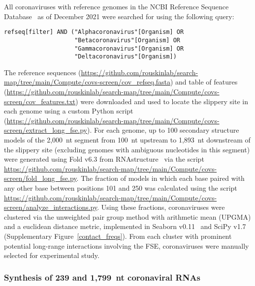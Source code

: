 \documentclass[main.tex]{subfiles}
\begin{document}
All coronaviruses with reference genomes in the NCBI Reference Sequence Database~\cite{OLeary2016} as of December 2021 were searched for using the following query:
\begin{verbatim}
refseq[filter] AND ("Alphacoronavirus"[Organism] OR
                    "Betacoronavirus"[Organism] OR
                    "Gammacoronavirus"[Organism] OR
                    "Deltacoronavirus"[Organism])
\end{verbatim}
The reference sequences (\url{https://github.com/rouskinlab/search-map/tree/main/Compute/covs-screen/cov_refseq.fasta}) and table of features (\url{https://github.com/rouskinlab/search-map/tree/main/Compute/covs-screen/cov_features.txt}) were downloaded and used to locate the slippery site in each genome using a custom Python script (\url{https://github.com/rouskinlab/search-map/tree/main/Compute/covs-screen/extract_long_fse.py}).
For each genome, up to 100 secondary structure models of the 2,000~nt segment from 100~nt upstream to 1,893~nt downstream of the slippery site (excluding genomes with ambiguous nucleotides in this segment) were generated using Fold v6.3 from RNAstructure~\cite{Reuter2010} via the script \url{https://github.com/rouskinlab/search-map/tree/main/Compute/covs-screen/fold_long_fse.py}.
The fraction of models in which each base paired with any other base between positions 101 and 250 was calculated using the script \url{https://github.com/rouskinlab/search-map/tree/main/Compute/covs-screen/analyze_interactions.py}.
Using these fractions, coronaviruses were clustered via the unweighted pair group method with arithmetic mean (UPGMA) and a euclidean distance metric, implemented in Seaborn v0.11~\cite{Waskom2021} and SciPy v1.7~\cite{Virtanen2020} (Supplementary Figure~\ref{contact_freqs}).
From each cluster with prominent potential long-range interactions involving the FSE, coronaviruses were manually selected for experimental study.

\subsubsection{Synthesis of 239 and 1,799~nt coronaviral RNAs}
\end{document}
